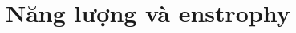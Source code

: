 \documentclass[CO_LUU_CHAT_NANG_CAO.tex]{subfiles}
\begin{document}
\section{Năng lượng và enstrophy}
\end{document}
